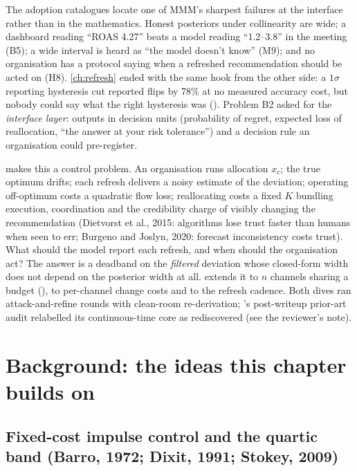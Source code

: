 The adoption catalogues locate one of MMM's sharpest failures at the interface rather than in the mathematics. Honest posteriors under collinearity are wide; a dashboard reading ``ROAS 4.27'' beats a model reading ``1.2--3.8'' in the meeting (B5); a wide interval is heard as ``the model doesn't know'' (M9); and no organisation has a protocol saying when a refreshed recommendation should be acted on (H8). \cref{ch:refresh} ended with the same hook from the other side: a $1\sigma$ reporting hysteresis cut reported flips by 78\% at no measured accuracy cost, but nobody could say what the right hysteresis was (). Problem B2 asked for the \emph{interface layer}: outputs in decision units (probability of regret, expected loss of reallocation, ``the answer at your risk tolerance'') and a decision rule an organisation could pre-register.

 makes this a control problem. An organisation runs allocation $x_c$; the true optimum drifts; each refresh delivers a noisy estimate of the deviation; operating off-optimum costs a quadratic flow loss; reallocating costs a fixed $K$ bundling execution, coordination and the credibility charge of visibly changing the recommendation (Dietvorst et al., 2015: algorithms lose trust faster than humans when seen to err; Burgeno and Joslyn, 2020: forecast inconsistency costs trust). What should the model report each refresh, and when should the organisation act? The answer is a deadband on the \emph{filtered} deviation whose closed-form width does not depend on the posterior width at all.  extends it to $n$ channels sharing a budget (), to per-channel change costs and to the refresh cadence. Both dives ran attack-and-refine rounds with clean-room re-derivation; 's post-writeup prior-art audit relabelled its continuous-time core as rediscovered (see the reviewer's note).

\section{Background: the ideas this chapter builds on}

\subsection{Fixed-cost impulse control and the quartic band (Barro, 1972; Dixit, 1991; Stokey, 2009)}


